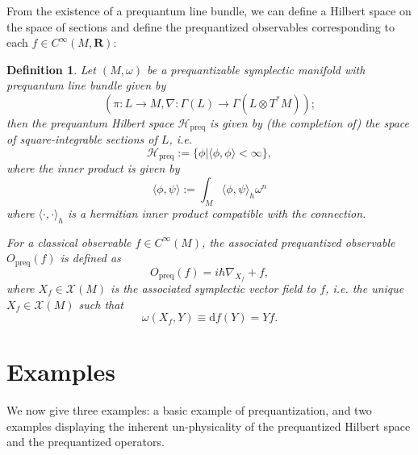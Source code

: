\documentclass{tufte-handout}
\newtheorem{defn}{Definition}
\def\d{\mathrm{d}}
\begin{document}
From the existence of a prequantum line bundle, we can define a Hilbert space on the space of sections and define the prequantized observables corresponding to each $f \in C^\infty(M,\mathbf{R})$:
\begin{defn}
Let $(M,\omega)$ be a prequantizable symplectic manifold with prequantum line bundle given by
$$
(\pi: L \to M, \nabla: \Gamma(L) \to \Gamma(L \otimes T^*M));
$$
then the \emph{prequantum Hilbert space} $\mathcal{H}_{\mbox{preq}}$ is given by (the completion of) the space of square-integrable sections of $L$, i.e.
$$
\mathcal{H}_{\mbox{preq}} := \{\phi | \langle\phi,\phi\rangle < \infty \},
$$
where the inner product is given by
$$
\langle \phi, \psi \rangle := \int_M \langle \phi,\psi \rangle_h \omega^n
$$
where $\langle \cdot,\cdot \rangle_h$ is a hermitian inner product compatible with the connection. %

For a classical observable $f \in C^\infty(M)$, the associated prequantized observable $O_{\mbox{preq}}(f)$ is defined as
$$
O_{\mbox{preq}}(f) = i\hbar\nabla_{X_f} + f,  %
$$
where $X_f \in \mathcal{X}(M)$ is the associated symplectic vector field to $f$, i.e. the unique $X_f \in \mathcal{X}(M)$ such that
$$
\omega(X_f,Y) \equiv \d f (Y) = Yf.
$$
\end{defn}


\section{Examples}
We now give three examples: a basic example of prequantization, and two examples displaying the inherent un-physicality of the prequantized Hilbert space and the prequantized operators.
\end{document}
